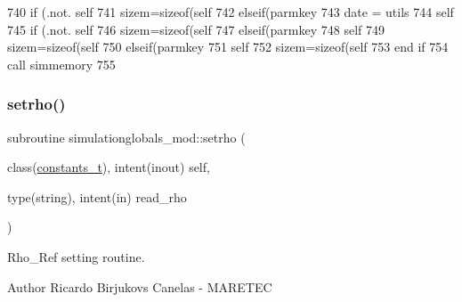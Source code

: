 \begin{DoxyCode}
740         \textcolor{keywordflow}{if} (.not. self%
741         sizem=sizeof(self%
742     \textcolor{keywordflow}{elseif}(parmkey%
743         date = utils%
744         self%
745         \textcolor{keywordflow}{if} (.not. self%
746         sizem=sizeof(self%
747     \textcolor{keywordflow}{elseif}(parmkey%
748         self%
749         sizem=sizeof(self%
750     \textcolor{keywordflow}{elseif}(parmkey%
751         self%
752         sizem=sizeof(self%
753 \textcolor{keywordflow}{    end if}
754     \textcolor{keyword}{call }simmemory%
755 
\end{DoxyCode}
\mbox{\label{namespacesimulationglobals__mod_a7d41fc05216d326ae8c0b090362430d3}} 
\subsubsection{\texorpdfstring{setrho()}{setrho()}}
{\footnotesize\ttfamily subroutine simulationglobals\+\_\+mod\+::setrho (\begin{DoxyParamCaption}\item[{class(\mbox{\hyperlink{structsimulationglobals__mod_1_1constants__t}{constants\+\_\+t}}), intent(inout)}]{self,  }\item[{type(string), intent(in)}]{read\+\_\+rho }\end{DoxyParamCaption})\hspace{0.3cm}{\ttfamily [private]}}



Rho\+\_\+\+Ref setting routine. 

\begin{DoxyAuthor}{Author}
Ricardo Birjukovs Canelas -\/ M\+A\+R\+E\+T\+EC 
\end{DoxyAuthor}

